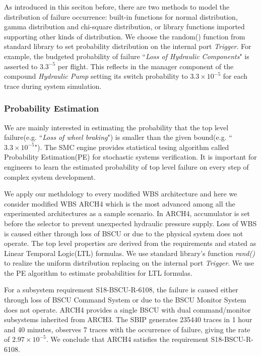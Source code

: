 As introduced in this seciton before, there are two methods to model the distribution of failure occurrence: built-in functions for normal distribution, gamma distribution and chi-square distribution, or library functions imported supporting other kinds of distribution. We choose the random() function from standard library to set probability distribution on the internal port \emph{Trigger}. For example, the budgeted probability of failure ``\emph{Loss of Hydraulic Components}" is asserted to $3.3^{-5}$ per flight. This reflects in the manager component of the compound \emph{Hydraulic Pump} setting its switch probability to $3.3\times10^{-5}$ for each trace during system simulation.

\subsubsection{Probability Estimation}
We are mainly interested in estimating the probability that the top level failure(e.g. ``\emph{Loss of wheel braking}") is smaller than the given bound(e.g. ``$3.3\times10^{-5}$"). The SMC engine provides statistical tesing algorithm called Probability Estimation(PE)\cite{pe04} for stochastic systems verification. It is important for engineers to learn the estimated probability of top level failure on every step of complex system development.

We apply our methdology to every modified WBS architecture and here we consider modified WBS ARCH4 which is the most advanced among all the experimented architectures as a sample scenario.
In ARCH4, accumulator is set before the selector to prevent unexpected hydraulic pressure supply. Loss of WBS is caused either through loss of BSCU or due to the physical system does not operate. The top level properties are derived from the requirements and stated as Linear Temporal Logic(LTL) formulas. We use standard library's function \emph{rand()} to realize the uniform distribution\cite{uniform} replacing on the internal port \emph{Trigger}. We use the PE algorithm to estimate probabilities for LTL formulas. 

For a subsystem requirement S18-BSCU-R-6108, the failure is caused either through loss of BSCU Command System or due to the BSCU Monitor System does not operate. ARCH4 provides a single BSCU with dual command/monitor subsystems inherited from ARCH3. The SBIP generates 235440 traces in 1 hour and 40 minutes, observes 7 traces with the occurrence of failure, giving the rate of $2.97\times10^{-5}$. We conclude that ARCH4 satisfies the requirement S18-BSCU-R-6108.

